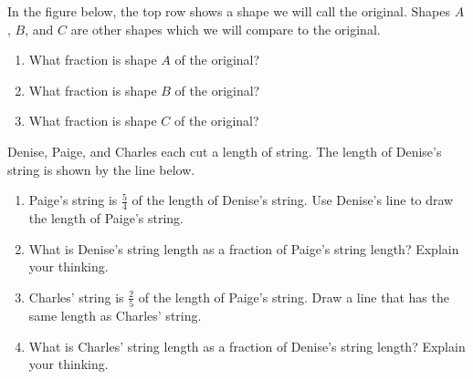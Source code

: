 \documentclass{ximera}
\begin{document}
\begin{problem} In the figure below, the top row shows a shape we will call the original.  Shapes $A$, $B$, and $C$ are other shapes which we will compare to the original. 
\begin{enumerate}
\item What fraction is shape $A$ of the original?
\item  What fraction is shape $B$ of the original?
\item What fraction is shape $C$ of the original?
\end{enumerate}

\begin{image}
\end{image}


\end{problem}

\begin{problem}

Denise, Paige, and Charles each cut a length of string. The length of Denise's string is shown by the line below. 
\begin{image} \end{image}
\vskip 1in
\begin{enumerate}
	\item Paige's string is $\frac{5}{4}$ of the length of Denise's string. Use Denise's line to draw the length of Paige's string.
	\item What is Denise's string length as a fraction of Paige's string length? Explain your thinking.
	\item Charles' string is $\frac{2}{5}$ of the length of Paige's string. Draw a line that has the same length as Charles' string.
	\item What is Charles' string length as a fraction of Denise's string length? Explain your thinking.
\end{enumerate}
\end{problem}
\end{document}
